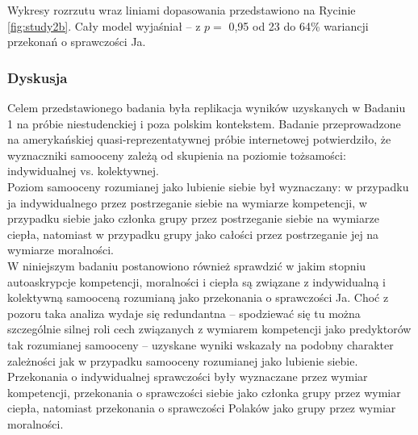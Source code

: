 \documentclass[man]{apa6}
\begin{document}
Wykresy rozrzutu wraz liniami dopasowania przedstawiono na Rycinie \ref{fig:study2b}. Cały model wyjaśniał -- z $p =$ 0,95 od 23 do 64\% wariancji przekonań o sprawczości Ja.\\

\begin{figure*}[htbp]
   \centering
   \caption{Autoaskrypcja cech związanych w wymiarami kompetencji, moralności i ciepła, a poziom przekonań o własnej sprawczości. Punkty oznaczają latentne wyniki dla każdej osoby, z kreskami oznaczajacymi błędy pomiarowe. Grubą linią przerywaną oznaczono najlepsze dopasowanie uzyskane w modelu regresyjnym, z cieńszymi liniami oznaczającymi błąd oszacowania.}

   \label{fig:study2b}
\end{figure*}


\subsubsection{Dyskusja}
Celem przedstawionego badania była replikacja wyników uzyskanych w Badaniu 1 na próbie niestudenckiej i poza polskim kontekstem. Badanie przeprowadzone na amerykańskiej quasi-reprezentatywnej próbie internetowej potwierdziło, że wyznaczniki samooceny zależą od skupienia na poziomie tożsamości: indywidualnej vs. kolektywnej.\\
Poziom samooceny rozumianej jako lubienie siebie był wyznaczany: w przypadku ja indywidualnego przez postrzeganie siebie na wymiarze kompetencji, w przypadku siebie jako członka grupy przez postrzeganie siebie na wymiarze ciepła, natomiast w przypadku grupy jako całości przez postrzeganie jej na wymiarze moralności.\\
W niniejszym badaniu postanowiono również sprawdzić w jakim stopniu autoaskrypcje kompetencji, moralności i ciepła są związane z indywidualną i kolektywną samooceną rozumianą jako przekonania o sprawczości Ja. Choć z pozoru taka analiza wydaje się redundantna -- spodziewać się tu można szczególnie silnej roli cech związanych z wymiarem kompetencji jako predyktorów tak rozumianej samooceny -- uzyskane wyniki wskazały na podobny charakter zależności jak w przypadku samooceny rozumianej jako lubienie siebie. Przekonania o indywidualnej sprawczości były wyznaczane przez wymiar kompetencji, przekonania o sprawczości siebie jako członka grupy przez wymiar ciepła, natomiast przekonania o sprawczości Polaków jako grupy przez wymiar moralności.\\
\end{document}
